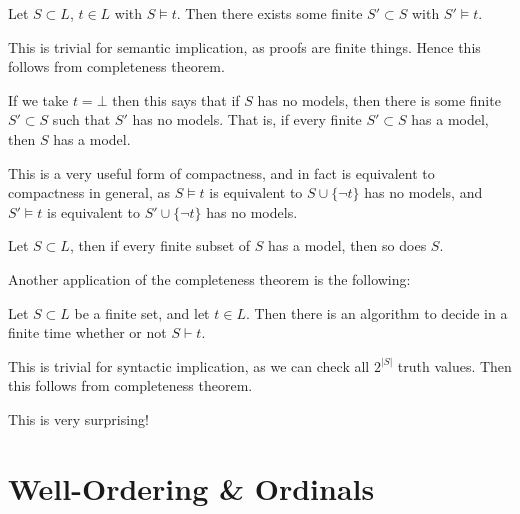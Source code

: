 \documentclass[12pt]{article}
\begin{document}
\begin{corollary}
	Let $S \subset L$, $t \in L$ with $S \models t$. Then there exists some finite $S' \subset S$ with $S' \models t$.
\end{corollary}

\begin{proofbox}
	This is trivial for semantic implication, as proofs are finite things. Hence this follows from completeness theorem.
\end{proofbox}

If we take $t = \bot$ then this says that if $S$ has no models, then there is some finite $S' \subset S$ such that $S'$ has no models. That is, if every finite $S' \subset S$ has a model, then $S$ has a model.

This is a very useful form of compactness, and in fact is equivalent to compactness in general, as $S \models t$ is equivalent to $S \cup \{\neg t\}$ has no models, and $S' \models t$ is equivalent to $S' \cup \{\neg t\}$ has no models.

\begin{corollary}
	Let $S \subset L$, then if every finite subset of $S$ has a model, then so does $S$.
\end{corollary}

Another application of the completeness theorem is the following:

\begin{corollary}
	Let $S \subset L$ be a finite set, and let $t \in L$. Then there is an algorithm to decide in a finite time whether or not $S \vdash t$.
\end{corollary}

\begin{proofbox}
	This is trivial for syntactic implication, as we can check all $2^{|S|}$ truth values. Then this follows from completeness theorem.
\end{proofbox}

\begin{remark}
	This is very surprising!
\end{remark}


\newpage

\section{Well-Ordering \& Ordinals}
\label{sec:well_ordering_and_ordinals}
\end{document}
